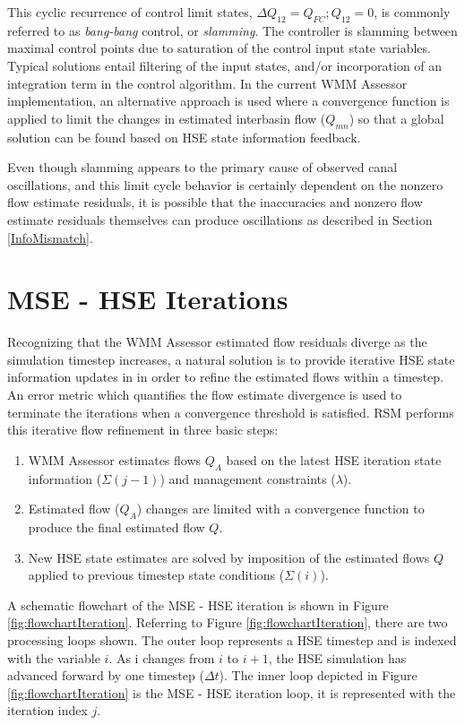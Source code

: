 This cyclic recurrence of control limit states, $\Delta Q_{12} =
Q_{FC}; Q_{12} = 0$, is commonly referred to as \emph{bang-bang}
control, or \emph{slamming}. The controller is slamming between
maximal control points due to saturation of the control input state
variables. Typical solutions entail filtering of the input states,
and/or incorporation of an integration term in the control
algorithm. In the current WMM Assessor implementation, an alternative
approach is used where a convergence function is applied to limit the
changes in estimated interbasin flow ($Q_{mn}$) so that a global
solution can be found based on HSE state information feedback.

Even though slamming appears to the primary cause of observed canal
oscillations, and this limit cycle behavior is certainly dependent on
the nonzero flow estimate residuals, it is possible that the
inaccuracies and nonzero flow estimate residuals themselves can
produce oscillations as described in Section \ref{InfoMismatch}.

\section{MSE - HSE Iterations}
Recognizing that the WMM Assessor estimated flow residuals diverge as
the simulation timestep increases, a natural solution is to provide
iterative HSE state information updates in in order to refine the
estimated flows within a timestep. An error metric which quantifies
the flow estimate divergence is used to terminate the iterations when
a convergence threshold is satisfied. RSM performs this iterative flow
refinement in three basic steps:

\begin{enumerate}
  \item WMM Assessor estimates flows $Q_A$ based on the latest HSE
    iteration state information ($\Sigma (j-1)$) and management constraints
    ($\lambda$).

  \item Estimated flow ($Q_A$) changes are limited with a convergence
    function to produce the final estimated flow $Q$.

  \item New HSE state estimates are solved by imposition of the
    estimated flows $Q$ applied to previous timestep state conditions
    ($\Sigma (i)$).
\end{enumerate}

A schematic flowchart of the MSE - HSE iteration is shown in Figure
\ref{fig:flowchartIteration}. Referring to Figure
\ref{fig:flowchartIteration}, there are two processing loops
shown. The outer loop represents a HSE timestep and is indexed with
the variable $i$. As i changes from $i$ to $i+1$, the HSE simulation has
advanced forward by one timestep ($\Delta t$). The inner loop depicted in
Figure \ref{fig:flowchartIteration} is the MSE - HSE iteration loop,
it is represented with the iteration index $j$.

